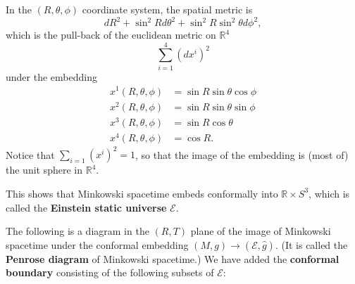 \documentclass[10pt,a4paper]{exam}
\newcommand{\sttl}[1]{{\color{darkblue}\sffamily\bfseries #1}}
\newcommand{\RR}{\mathbb{R}}
\newcommand{\esu}{\mathscr{E}}
\begin{document}
\begin{questions}
\begin{parts}
      \begin{solution}
        In the $(R,\theta,\phi)$ coordinate system, the spatial
        metric is
        \begin{equation*}
          dR^2 + \sin^2 R d\theta^2 + \sin^2R \sin^2\theta
          d\phi^2,
        \end{equation*}
        which is the pull-back of the euclidean metric on $\RR^4$
        \begin{equation*}
          \sum_{i=1}^4 (dx^i)^2
        \end{equation*}
        under the embedding
        \begin{equation*}
          \begin{split}
            x^1(R,\theta,\phi) &= \sin R \sin\theta \cos\phi\\
            x^2(R,\theta,\phi) &= \sin R \sin\theta \sin\phi\\
            x^3(R,\theta,\phi) &= \sin R \cos\theta\\
            x^4(R,\theta,\phi) &= \cos R.
          \end{split}
        \end{equation*}
        Notice that $\sum_{i=1} (x^i)^2 = 1$, so that the image of the
        embedding is (most of) the unit sphere in $\RR^4$.
      \end{solution}

      \begin{EnvUplevel}
        This shows that Minkowski spacetime embeds conformally into
        $\RR \times S^3$, which is called the \sttl{Einstein static
          universe} $\esu$.
      \end{EnvUplevel}
    \end{parts}

  \question The following is a diagram in the $(R,T)$ plane of the
        image of Minkowski spacetime under the conformal embedding
        $(M,g) \to (\esu, \hat g)$.  (It is called the \sttl{Penrose
          diagram} of Minkowski spacetime.)  We have added the
        \sttl{conformal boundary} consisting of the following subsets of $\esu$:


\end{questions}
\end{document}
